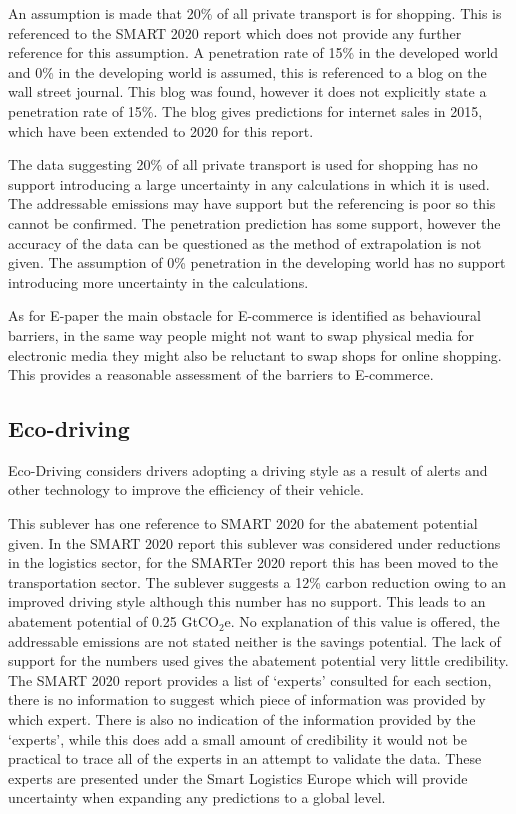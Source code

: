 An assumption is made that 20\% of all private transport is for shopping. This is referenced to the SMART 2020 report which does not provide any further reference for this assumption. A penetration rate of 15\% in the developed world and 0\% in the developing world is assumed, this is referenced to a blog on the wall street journal. This blog was found, however it does not explicitly state a penetration rate of 15\%. The blog gives predictions for internet sales in 2015, which have been extended to 2020 for this report.

 The data suggesting 20\% of all private transport is used for shopping has no support introducing a large uncertainty in any calculations in which it is used. The addressable emissions may have support but the referencing is poor so this cannot be confirmed. The penetration prediction has some support, however the accuracy of the data can be questioned as the method of extrapolation is not given. The assumption of 0\% penetration in the developing world has no support introducing more uncertainty in the calculations. 
 
 As for E-paper the main obstacle for E-commerce is identified as behavioural barriers, in the same way people might not want to swap physical media for electronic media they might also be reluctant to swap shops for online shopping. This provides a reasonable assessment of the barriers to E-commerce.


\subsection{Eco-driving}
Eco-Driving considers drivers adopting a driving style as a result of alerts and other technology to improve the efficiency of their vehicle. 

 This sublever has one reference to SMART 2020 for the abatement potential given. In the SMART 2020 report this sublever was considered under reductions in the logistics sector, for the SMARTer 2020 report this has been moved to the transportation sector. The sublever suggests a 12\% carbon reduction owing to an improved driving style although this number has no support. This leads to an abatement potential of 0.25 GtCO$_2$e. No explanation of this value is offered, the addressable emissions are not stated neither is the savings potential. The lack of support for the numbers used gives the abatement potential very little credibility. The SMART 2020 report provides a list of ‘experts’ consulted for each section, there is no information to suggest which piece of information was provided by which expert. There is also no indication of the information provided by the ‘experts’, while this does add a small amount of credibility it would not be practical to trace all of the experts in an attempt to validate the data. These experts are presented under the Smart Logistics Europe which will provide uncertainty when expanding any predictions to a global level. 
 
